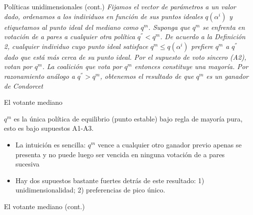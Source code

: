 \documentclass[
  ignorenonframetext,
]{beamer}
\providecommand{\tightlist}{%
  \setlength{\itemsep}{0pt}\setlength{\parskip}{0pt}}\usepackage{longtable,booktabs,array}
\begin{document}
\begin{frame}
\begin{block}{Políticas unidimensionales (cont.)}
\protect\hypertarget{poluxedticas-unidimensionales-cont.-1}{}
\emph{Fijamos el vector de parámetros a un valor dado, ordenamos a los
individuos en función de sus puntos ideales \(q(\alpha^{i})\) y
etiquetamos al punto ideal del mediano como \(q^{m}\). Suponga que
\(q^{m}\) se enfrenta en votación de a pares a cualquier otra política
\(q^{''}<q^{m}\). De acuerdo a la Definición 2, cualquier individuo cuyo
punto ideal satisface \(q^{m} \leq q(\alpha^{i})\) prefiere \(q^{m}\) a
\(q^{''}\) dado que está más cerca de su punto ideal. Por el supuesto de
voto sincero (A2), votan por \(q^{m}\). La coalición que vota por
\(q^{m}\) entonces constituye una mayoría. Por razonamiento análogo a
\(q^{''}>q^{m}\), obtenemos el resultado de que \(q^{m}\) es un ganador
de Condorcet}
\end{block}

\begin{block}{El votante mediano}
\protect\hypertarget{el-votante-mediano}{}
\begin{tcolorbox}[enhanced jigsaw, titlerule=0mm, breakable, colback=white, left=2mm, coltitle=black, toptitle=1mm, leftrule=.75mm, opacityback=0, bottomtitle=1mm, opacitybacktitle=0.6, colbacktitle=quarto-callout-tip-color!10!white, title={Corolario 1}, toprule=.15mm, colframe=quarto-callout-tip-color-frame, rightrule=.15mm, arc=.35mm, bottomrule=.15mm]

\(q^{m}\) es la única política de equilibrio (punto estable) bajo regla
de mayoría pura, esto es bajo supuestos A1-A3.

\end{tcolorbox}

\begin{itemize}
\tightlist
\item
  La intuición es sencilla: \(q^{m}\) vence a cualquier otro ganador
  previo apenas se presenta y no puede luego ser vencida en ninguna
  votación de a pares sucesiva
\item
  Hay dos supuestos bastante fuertes detrás de este resultado: 1)
  unidimensionalidad; 2) preferencias de pico único.
\end{itemize}
\end{block}

\begin{block}{El votante mediano (cont.)}
\protect\hypertarget{el-votante-mediano-cont.}{}
\begin{figure}


\end{figure}
\end{block}
\end{frame}
\end{document}
